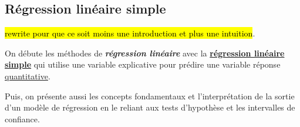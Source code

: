 \documentclass[french]{article}
\begin{document}
\begin{multicols*}{2}
%
%
%
%



\newpage
\section{Régression linéaire simple}\label{sec:SLR}
\hl{rewrite pour que ce soit moins une introduction et plus une intuition}.
\begin{rappel_enhanced}[Contexte]
On débute les méthodes de \textit{\textbf{régression linéaire}} avec la \textbf{\underline{régression linéaire simple}} qui utilise une variable explicative pour prédire une variable réponse \underline{quantitative}. 

\bigskip

Puis, on présente aussi les concepts fondamentaux et l'interprétation de la sortie d'un modèle de régression en le reliant aux tests d'hypothèse et les intervalles de confiance.
\end{rappel_enhanced}


\end{multicols*}
\end{document}
